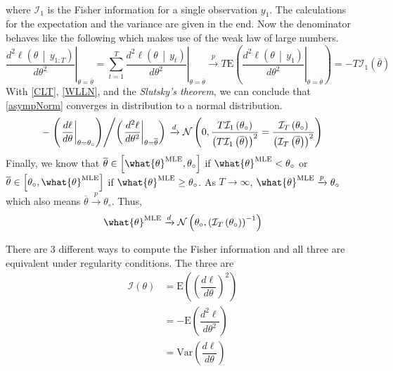 \documentclass[answers]{exam}
\begin{document}
\begin{questions}
\begin{solution}
\begin{enumerate}[a)]
\begin{itemize}
\begin{align}
      \end{align}
      where $\mathcal{I}_{1}$ is the Fisher information for a single observation $y_{1}$. The calculations for the expectation and the variance are given in the end. Now the denominator behaves like the following which makes use of the weak law of large numbers.
      \begin{equation}\label{WLLN}
        \left.\dfrac{d^{2}\ell\left(\theta\,\middle|\,y_{1:T}\right)}{d\theta^{2}}\right|_{\theta=\overline{\theta}}=\sum_{t=1}^{T}\left.\dfrac{d^{2}\ell\left(\theta\,\middle|\,y_{t}\right)}{d\theta^{2}}\right|_{\theta=\overline{\theta}} \xrightarrow{p} T\mathrm{E}\left(\left.\dfrac{d^{2}\ell\left(\theta\,\middle|\,y_{1}\right)}{d\theta^{2}}\right|_{\theta=\overline{\theta}} \right) =-T\mathcal{I}_{1}\left(\overline{\theta}\right)
      \end{equation}
      With \ref{CLT}, \ref{WLLN}, and the \emph{Slutsky's theorem}, we can conclude that \ref{asympNorm} converges in distribution to a normal distribution.
      \begin{equation}
        -\left.\left(\left.\dfrac{d\ell}{d\theta}\right|_{\theta=\theta_{\circ}}\right)\middle/\left(\left.\dfrac{d^{2}\ell}{d\theta^{2}}\right|_{\theta=\overline{\theta}}\right)\right. \xrightarrow{d} \mathcal{N}\left(0,\dfrac{T\mathcal{I}_{1}\left(\theta_{\circ}\right)}{\left(T\mathcal{I}_{1}\left(\overline{\theta}\right)\right)^{2}}=\dfrac{\mathcal{I}_{T}\left(\theta_{\circ}\right)}{\left(\mathcal{I}_{T}\left(\overline{\theta}\right)\right)^{2}}\right)
      \end{equation}
      Finally, we know that $\overline{\theta}\in \left[\what{\theta}^{\text{MLE}},\theta_{\circ}\right]$ if $\what{\theta}^{\text{MLE}} < \theta_{\circ}$ or $\overline{\theta}\in \left[\theta_{\circ},\what{\theta}^{\text{MLE}}\right]$ if $\what{\theta}^{\text{MLE}} \geq \theta_{\circ}$. As $T\to\infty$, $\what{\theta}^{\text{MLE}}\xrightarrow{p}\theta_{\circ}$ which also means $\overline{\theta}\xrightarrow{p}\theta_{\circ}$. Thus,
      \begin{equation}
        \what{\theta}^{\text{MLE}} \xrightarrow{d} \mathcal{N}\left(\theta_{\circ},\left(\mathcal{I}_{T}\left(\theta_{\circ}\right)\right)^{-1}\right)
      \end{equation}
      \end{itemize}
    \end{enumerate}
    There are 3 different ways to compute the Fisher information and all three are equivalent under regularity conditions. The three are
    \begin{align}
      \mathcal{I}\left(\theta\right) &= \mathrm{E}\left(\left(\dfrac{d\ell}{d\theta}\right)^{2}\right)\\
      &= -\mathrm{E}\left(\dfrac{d^{2}\ell}{d\theta^{2}}\right)\\
      &= \mathrm{Var}\left(\dfrac{d\ell}{d\theta}\right)
    \end{align}
  \end{solution}
  \end{questions}
\end{document}
